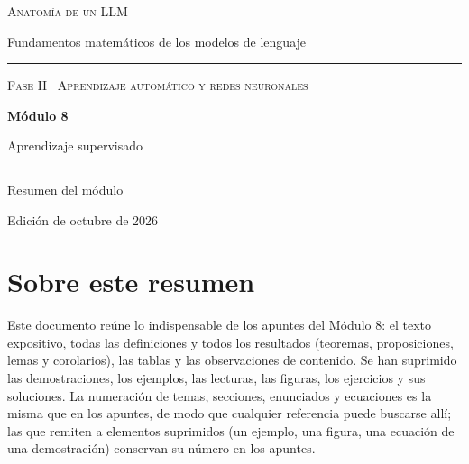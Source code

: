 \documentclass[11pt,a4paper,twoside,openany]{book}
\begin{document}
\frontmatter
\begin{titlepage}
\centering
\vspace*{2.5cm}
{\large\scshape Anatomía de un LLM}\par
\vspace{0.4cm}
{\normalsize Fundamentos matemáticos de los modelos de lenguaje}\par
\vspace{2.2cm}
\rule{\textwidth}{0.8pt}\par\vspace{0.5cm}
{\small\scshape Fase II \textperiodcentered\ Aprendizaje automático y redes neuronales}\par\vspace{0.3cm}
{\Huge\bfseries Módulo 8\par}\vspace{0.3cm}
{\LARGE Aprendizaje supervisado\par}
\vspace{0.5cm}\rule{\textwidth}{0.4pt}\par
\vspace{1.6cm}
{\large Resumen del módulo}\par
\vfill
{\small Edición de octubre de 2026}\par
\end{titlepage}

\chapter*{Sobre este resumen}

Este documento reúne lo indispensable de los apuntes del Módulo 8: el texto expositivo, todas las definiciones y todos los resultados (teoremas, proposiciones, lemas y corolarios), las tablas y las observaciones de contenido. Se han suprimido las demostraciones, los ejemplos, las lecturas, las figuras, los ejercicios y sus soluciones. La numeración de temas, secciones, enunciados y ecuaciones es la misma que en los apuntes, de modo que cualquier referencia puede buscarse allí; las que remiten a elementos suprimidos (un ejemplo, una figura, una ecuación de una demostración) conservan su número en los apuntes.
\end{document}
